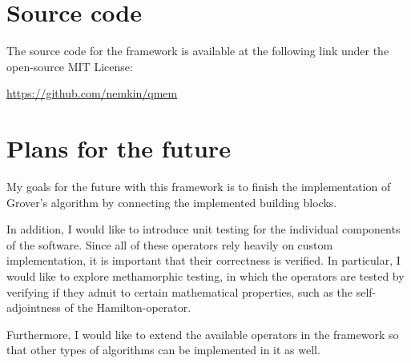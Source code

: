 \section{Source code}

The source code for the framework is available at the following link under the open-source MIT License:

\href{https://github.com/nemkin/qmem}{https://github.com/nemkin/qmem}

\section{Plans for the future}

My goals for the future with this framework is to finish the implementation of Grover's algorithm by connecting the implemented building blocks.

In addition, I would like to introduce unit testing for the individual components of the software. Since all of these operators rely heavily on custom implementation, it is important that their correctness is verified. In particular, I would like to explore methamorphic testing, in which the operators are tested by verifying if they admit to certain mathematical properties, such as the self-adjointness of the Hamilton-operator.

Furthermore, I would like to extend the available operators in the framework so that other types of algorithms can be implemented in it as well.
